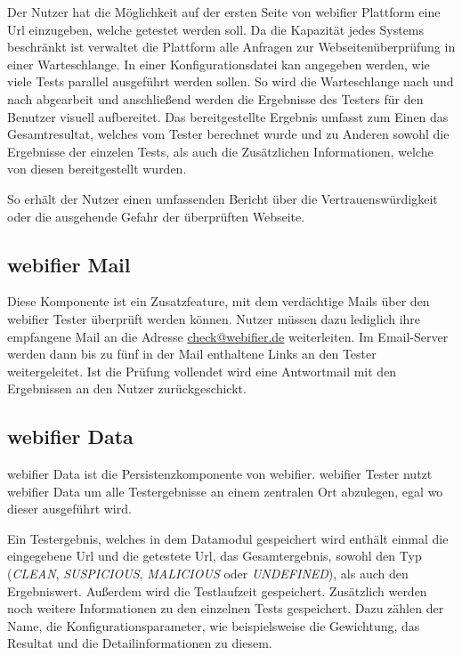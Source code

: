 Der Nutzer hat die Möglichkeit auf der ersten Seite von webifier Plattform eine Url einzugeben, welche getestet werden soll. Da die Kapazität jedes Systems beschränkt ist verwaltet die Plattform alle Anfragen zur Webseitenüberprüfung in einer Warteschlange. In einer Konfigurationsdatei kan angegeben werden, wie viele Tests parallel ausgeführt werden sollen. So wird die Warteschlange nach und nach abgearbeit und anschließend werden die Ergebnisse des Testers für den Benutzer visuell aufbereitet. Das bereitgestellte Ergebnis umfasst zum Einen das Gesamtresultat, welches vom Tester berechnet wurde und zu Anderen sowohl die Ergebnisse der einzelen Tests, als auch die Zusätzlichen Informationen, welche von diesen bereitgestellt wurden.

So erhält der Nutzer einen umfassenden Bericht über die Vertrauenswürdigkeit oder die ausgehende Gefahr der überprüften Webseite.

\subsection{webifier Mail}
Diese Komponente ist ein Zusatzfeature, mit dem verdächtige Mails über den webifier Tester überprüft werden können.
Nutzer müssen dazu lediglich ihre empfangene Mail an die Adresse \href{mailto:check@webifier.de}{check@webifier.de} weiterleiten.
Im Email-Server werden dann bis zu fünf in der Mail enthaltene Links an den Tester weitergeleitet.
Ist die Prüfung vollendet wird eine Antwortmail mit den Ergebnissen an den Nutzer zurückgeschickt.

\subsection{webifier Data}
\label{sec:konzept-data}

webifier Data ist die Persistenzkomponente von webifier. webifier Tester nutzt webifier Data um alle Testergebnisse an einem zentralen Ort abzulegen, egal wo dieser ausgeführt wird.

Ein Testergebnis, welches in dem Datamodul gespeichert wird enthält einmal die eingegebene Url und die getestete Url, das Gesamtergebnis, sowohl den Typ (\textit{CLEAN}, \textit{SUSPICIOUS}, \textit{MALICIOUS} oder \textit{UNDEFINED}), als auch den Ergebniswert. Außerdem wird die Testlaufzeit gespeichert. Zusätzlich werden noch weitere Informationen zu den einzelnen Tests gespeichert. Dazu zählen der Name, die Konfigurationsparameter, wie beispielsweise die Gewichtung, das Resultat und die Detailinformationen zu diesem.

